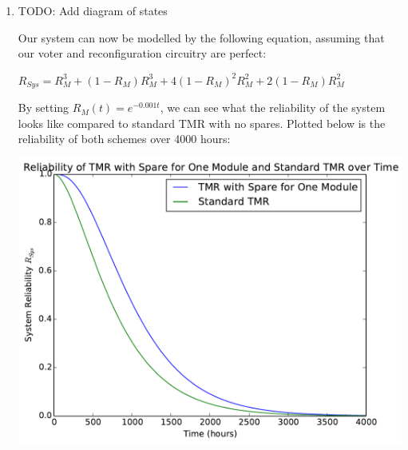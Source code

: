 \documentclass[a4paper,12pt]{article}
\begin{document}
\begin{enumerate}
        \item TODO: Add diagram of states

        Our system can now be modelled by the following equation, assuming that our voter and reconfiguration circuitry are perfect:

        $R_{Sys} = R_M^3 + (1 - R_M)R_M^3 + 4(1 - R_M)^2R_M^2 + 2(1 - R_M)R_M^2$

        By setting $R_M(t) = e^{-0.001t}$, we can see what the reliability of the system looks like compared to standard TMR with no spares. Plotted below is the reliability of both schemes over 4000 hours:

        \begin{center}
        \includegraphics[scale=0.7]{question_7_graph}
        \end{center}

    \end{enumerate}
\end{document}
